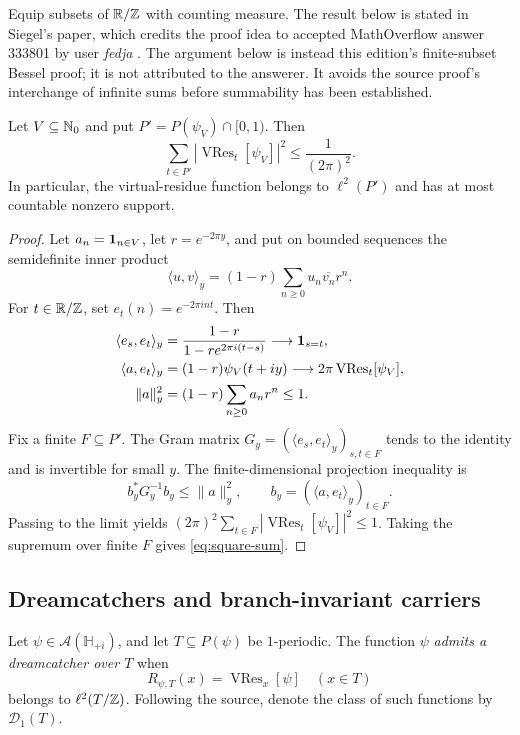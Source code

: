 Equip subsets of $\mathbb R/\mathbb Z$ with counting measure.  The result below is stated
in Siegel's paper, which credits the proof idea to accepted MathOverflow
answer 333801 by user \emph{fedja} \cite{FedjaMO333801}.  The argument below
is instead this edition's finite-subset Bessel proof; it is not attributed to
the answerer.  It avoids the source proof's interchange of infinite sums
before summability has been established.

\begin{lemma}
\label{lem:square-sum}
Let $V\subseteq\mathbb N_0$ and put $P'=P(\psi_V)\cap[0,1)$.  Then
\begin{equation}
\label{eq:square-sum}
 \sum_{t\in P'}|\operatorname{VRes}_t[\psi_V]|^2
 \leq\frac1{(2\pi)^2}.
\end{equation}
In particular, the virtual-residue function belongs to $\ell^2(P')$ and
has at most countable nonzero support.
\end{lemma}

\begin{proof}
Let $a_n=\mathbf 1_{n\in V}$, let $r=e^{-2\pi y}$, and put on bounded sequences
the semidefinite inner product
\[
 \langle u,v\rangle_y=(1-r)\sum_{n\geq0}u_n\overline{v_n}r^n.
\]
For $t\in\mathbb R/\mathbb Z$, set $e_t(n)=e^{-2\pi int}$.  Then
\begin{align*}
 \langle e_s,e_t\rangle_y
 &=\frac{1-r}{1-re^{2\pi i(t-s)}}
   \longrightarrow\mathbf 1_{s=t},\\
 \langle a,e_t\rangle_y
 &=(1-r)\psi_V(t+iy)
   \longrightarrow2\pi\operatorname{VRes}_t[\psi_V],\\
 \|a\|_y^2&=(1-r)\sum_{n\geq0}a_nr^n\leq1.
\end{align*}
Fix a finite $F\subseteq P'$.  The Gram matrix
$G_y=(\langle e_s,e_t\rangle_y)_{s,t\in F}$ tends to the identity and is
invertible for small $y$.  The finite-dimensional projection inequality is
\[
 b_y^*G_y^{-1}b_y\leq\|a\|_y^2,
 \qquad b_y=(\langle a,e_t\rangle_y)_{t\in F}.
\]
Passing to the limit yields
$(2\pi)^2\sum_{t\in F}|\operatorname{VRes}_t[\psi_V]|^2\leq1$.
Taking the supremum over finite $F$ gives \cref{eq:square-sum}.
\end{proof}

\subsection{Dreamcatchers and branch-invariant carriers}

\begin{definition}
Let $\psi\in\mathcal A(\mathbb H_{+i})$, and let
$T\subseteq P(\psi)$ be $1$-periodic.  The function $\psi$ \emph{admits a
dreamcatcher over $T$} when
\begin{equation}
\label{eq:dreamcatcher}
 R_{\psi,T}(x)=\operatorname{VRes}_x[\psi]
 \quad(x\in T)
\end{equation}
belongs to $\ell^2(T/\mathbb Z)$.  Following the source, denote the class of such
functions by $\mathcal D_1(T)$.
\end{definition}

